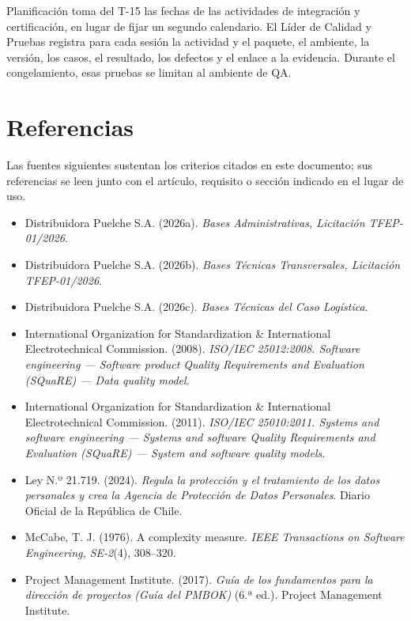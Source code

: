 Planificación toma del T-15 las fechas de las actividades de integración y certificación, en lugar de fijar un segundo calendario. El Líder de Calidad y Pruebas registra para cada sesión la actividad y el paquete, el ambiente, la versión, los casos, el resultado, los defectos y el enlace a la evidencia. Durante el congelamiento, esas pruebas se limitan al ambiente de QA.

\section*{Referencias}

Las fuentes siguientes sustentan los criterios citados en este documento; sus referencias se leen junto con el artículo, requisito o sección indicado en el lugar de uso.

\begin{itemize}[before=\raggedright,itemsep=0pt,parsep=0pt,topsep=2pt]
  \item Distribuidora Puelche S.A. (2026a). \emph{Bases Administrativas, Licitación TFEP-01/2026}.
  \item Distribuidora Puelche S.A. (2026b). \emph{Bases Técnicas Transversales, Licitación TFEP-01/2026}.
  \item Distribuidora Puelche S.A. (2026c). \emph{Bases Técnicas del Caso Logística}.
  \item International Organization for Standardization \& International Electrotechnical Commission. (2008). \emph{ISO/IEC 25012:2008. Software engineering — Software product Quality Requirements and Evaluation (SQuaRE) — Data quality model}.
  \item International Organization for Standardization \& International Electrotechnical Commission. (2011). \emph{ISO/IEC 25010:2011. Systems and software engineering — Systems and software Quality Requirements and Evaluation (SQuaRE) — System and software quality models}.
  \item Ley N.º 21.719. (2024). \emph{Regula la protección y el tratamiento de los datos personales y crea la Agencia de Protección de Datos Personales}. Diario Oficial de la República de Chile.
  \item McCabe, T. J. (1976). A complexity measure. \emph{IEEE Transactions on Software Engineering, SE-2}(4), 308–320.
  \item Project Management Institute. (2017). \emph{Guía de los fundamentos para la dirección de proyectos (Guía del PMBOK)} (6.ª ed.). Project Management Institute.
\end{itemize}
